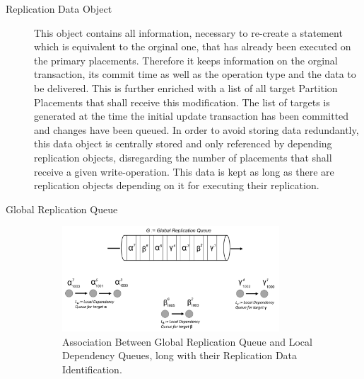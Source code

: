\begin{description}

    \item[Replication Data Object] This object contains all information, necessary to re-create a statement which is equivalent to the orginal one,
    that has already been executed on the primary placements. 
    Therefore it keeps information on the orginal transaction, its commit time as well as the operation type and the data to be delivered. 
    This is further enriched with a list of all target Partition Placements that shall receive this modification. The list of targets is generated
    at the time the initial update transaction has been committed and changes have been queued. In order to avoid storing data redundantly, this data object 
    is centrally stored and only referenced by depending replication objects, disregarding the number of placements that shall receive a given write-operation.
    This data is kept as long as there are replication objects depending on it for executing their replication.


    \item[Global Replication Queue] 
    
    \begin{figure}[t]
        \centering
        \includegraphics[width=0.8\textwidth]{Figures/Queue.png}
        \caption{Association Between Global Replication Queue and Local Dependency Queues, long with their Replication Data Identification.}
        \label{fig:queue}
    \end{figure}
  

\end{description}
